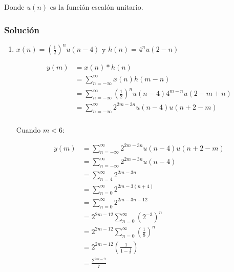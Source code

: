 \documentclass[a4paper,12pt,final]{article}
\begin{document}
    \noindent Donde $u\left(n\right)$ es la función escalón unitario.

    \subsubsection*{Solución}
      \begin{enumerate}[label=\alph*)]
        \item $x\left(n\right) = \left(\frac{1}{2}\right)^n u\left(n-4\right)$ y $h\left(n\right) = 4^n u\left(2-n\right)$

          \begin{equation*}
            \begin{split}
              y\left(m\right) & = x\left(n\right) * h\left(n\right) \\
                              & = \sum_{n=-\infty}^{\infty} x\left(n\right)h\left(m-n\right) \\
                              & = \sum_{n=-\infty}^{\infty} \left(\frac{1}{2}\right)^n u\left(n-4\right)4^{m-n} u\left(2-m+n\right) \\
                              & = \sum_{n=-\infty}^{\infty} 2^{2m-3n} u\left(n-4\right) u\left(n+2-m\right) \\
            \end{split}
          \end{equation*}

          \noindent Cuando $m<6$:

          \begin{equation*}
            \begin{split}
              y\left(m\right) & = \sum_{n=-\infty}^{\infty} 2^{2m-3n} u\left(n-4\right) u\left(n+2-m\right) \\
                              & = \sum_{n=-\infty}^{\infty} 2^{2m-3n} u\left(n-4\right) \\
                              & = \sum_{n=4}^{\infty} 2^{2m-3n} \\
                              & = \sum_{n=0}^{\infty} 2^{2m-3\left(n+4\right)} \\
                              & = \sum_{n=0}^{\infty} 2^{2m-3n-12} \\
                              & = 2^{2m-12} \sum_{n=0}^{\infty} \left(2^{-3}\right)^{n} \\
                              & = 2^{2m-12} \sum_{n=0}^{\infty} \left(\frac{1}{8}\right)^{n} \\
                              & = 2^{2m-12} \left(\frac{1}{1-\frac{1}{8}}\right) \\
                              & = \frac{2^{2m-9}}{7}
            \end{split}
          \end{equation*}
          \vfill
          \newpage


\end{enumerate}
\end{document}
